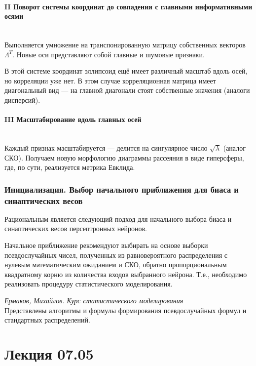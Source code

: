 \documentclass{article}
\numberwithin{equation}{subsection}
\begin{document}
\paragraph{II Поворот системы координат до совпадения с 
главными информативными осями}\mbox{}\\
Выполняется умножение на транспонированную матрицу собственных векторов $\Lambda^T$.
Новые оси представляют собой главные и шумовые признаки.

В этой системе координат эллипсоид ещё имеет различный масштаб вдоль осей, но корреляции
уже нет.
В этом случае корреляционная матрица имеет диагональный вид --- на главной диагонали
стоят собственные значения (аналоги дисперсий).


\paragraph{III Масштабирование вдоль главных осей}\mbox{}\\
Каждый признак масштабируется --- делится на сингулярное число $\sqrt{\lambda}$
(аналог СКО).
Получаем новую морфологию диаграммы рассеяния в виде гиперсферы, где, по сути, реализуется
метрика Евклида.




\subsubsection{Инициализация. Выбор начального приближения для 
биаса и синаптических весов}

Рациональным является следующий подход для начального выбора биаса и синаптических
весов персептронных нейронов.

Начальное приближение рекомендуют выбирать на основе выборки псевдослучайных чисел,
полученных из равновероятного распределения с нулевым математическим ожиданием 
и СКО, обратно пропорциональным квадратному корню из количества входов выбранного нейрона.
Т.е., необходимо реализовать процедуру статистического моделирования.

\begin{myquote}
    \textit{Ермаков, Михайлов. Курс статистического моделирования}\\
    Представлены алгоритмы и формулы формирования псевдослучайных формул
    и стандартных распределений.
\end{myquote}



\newpage
\section{Лекция 07.05}
\end{document}
